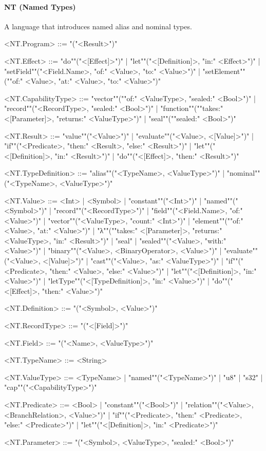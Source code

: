 \documentclass[main.tex]{subfiles}
\begin{document}
\paragraph{ NT (Named Types) } A language that introduces named alias and nominal types.
\begin{grammar}
	\footnotesize
				<NT.Program> ::=
							"("<Result>")"
				\par
				<NT.Effect> ::=
						"do""("<[Effect]>")"
						| "let""("<[Definition]>, "in:" <Effect>")"
						| "setField""("<Field.Name>, "of:" <Value>, "to:" <Value>")"
						| "setElement""(""of:" <Value>, "at:" <Value>, "to:" <Value>")"
				\par
				<NT.CapabilityType> ::=
						"vector""(""of:" <ValueType>, "sealed:" <Bool>")"
						| "record""("<RecordType>, "sealed:" <Bool>")"
						| "function""(""takes:" <[Parameter]>, "returns:" <ValueType>")"
						| "seal""(""sealed:" <Bool>")"
				\par
				<NT.Result> ::=
						"value""("<Value>")"
						| "evaluate""("<Value>, <[Value]>")"
						| "if""("<Predicate>, "then:" <Result>, "else:" <Result>")"
						| "let""("<[Definition]>, "in:" <Result>")"
						| "do""("<[Effect]>, "then:" <Result>")"
				\par
				<NT.TypeDefinition> ::=
						"alias""("<TypeName>, <ValueType>")"
						| "nominal""("<TypeName>, <ValueType>")"
				\par
				<NT.Value> ::=
						<Int> |
								<Symbol> |
						"constant""("<Int>")"
						| "named""("<Symbol>")"
						| "record""("<RecordType>")"
						| "field""("<Field.Name>, "of:" <Value>")"
						| "vector""("<ValueType>, "count:" <Int>")"
						| "element""(""of:" <Value>, "at:" <Value>")"
						| "λ""(""takes:" <[Parameter]>, "returns:" <ValueType>, "in:" <Result>")"
						| "seal"
						| "sealed""("<Value>, "with:" <Value>")"
						| "binary""("<Value>, <BinaryOperator>, <Value>")"
						| "evaluate""("<Value>, <[Value]>")"
						| "cast""("<Value>, "as:" <ValueType>")"
						| "if""("<Predicate>, "then:" <Value>, "else:" <Value>")"
						| "let""("<[Definition]>, "in:" <Value>")"
						| "letType""("<[TypeDefinition]>, "in:" <Value>")"
						| "do""("<[Effect]>, "then:" <Value>")"
				\par
				<NT.Definition> ::=
							"("<Symbol>, <Value>")"
				\par
				<NT.RecordType> ::=
							"("<[Field]>")"
				\par
				<NT.Field> ::=
							"("<Name>, <ValueType>")"
				\par
				<NT.TypeName> ::=
						<String>
				\par
				<NT.ValueType> ::=
								<TypeName> |
						"named""("<TypeName>")"
						| "u8"
						| "s32"
						| "cap""("<CapabilityType>")"
				\par
				<NT.Predicate> ::=
						<Bool> |
						"constant""("<Bool>")"
						| "relation""("<Value>, <BranchRelation>, <Value>")"
						| "if""("<Predicate>, "then:" <Predicate>, "else:" <Predicate>")"
						| "let""("<[Definition]>, "in:" <Predicate>")"
				\par
				<NT.Parameter> ::=
							"("<Symbol>, <ValueType>, "sealed:" <Bool>")"
				\par
\end{grammar}
\end{document}
